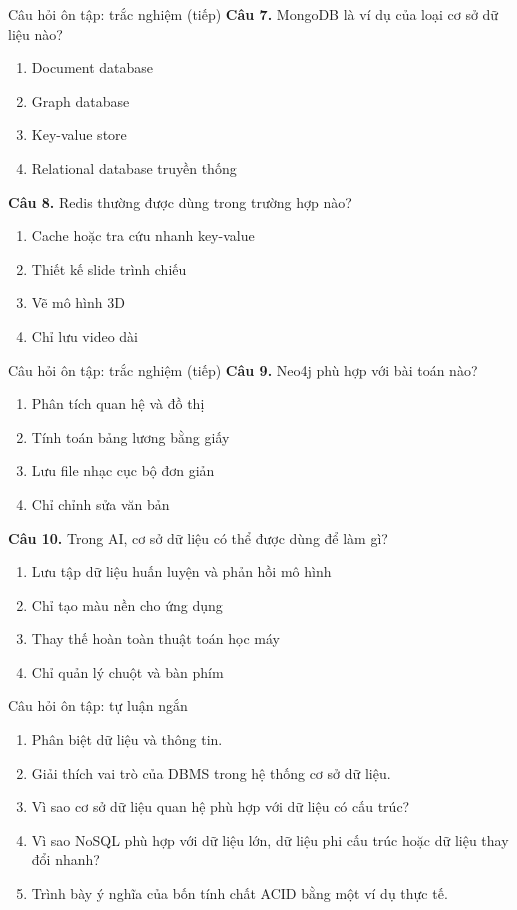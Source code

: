 ﻿\documentclass[aspectratio=169,11pt]{beamer}
\newcommand{\tightlist}{\setlength{\itemsep}{2pt}\setlength{\parskip}{0pt}}
\newcommand{\qoption}[2]{\item[#1.] #2}
\begin{document}
\begin{frame}{Câu hỏi ôn tập: trắc nghiệm (tiếp)}
\small
\textbf{Câu 7.} MongoDB là ví dụ của loại cơ sở dữ liệu nào?
\begin{enumerate}
\tightlist
  \qoption{A}{Document database}
  \qoption{B}{Graph database}
  \qoption{C}{Key-value store}
  \qoption{D}{Relational database truyền thống}
\end{enumerate}

\textbf{Câu 8.} Redis thường được dùng trong trường hợp nào?
\begin{enumerate}
\tightlist
  \qoption{A}{Cache hoặc tra cứu nhanh key-value}
  \qoption{B}{Thiết kế slide trình chiếu}
  \qoption{C}{Vẽ mô hình 3D}
  \qoption{D}{Chỉ lưu video dài}
\end{enumerate}
\end{frame}

\begin{frame}{Câu hỏi ôn tập: trắc nghiệm (tiếp)}
\small
\textbf{Câu 9.} Neo4j phù hợp với bài toán nào?
\begin{enumerate}
\tightlist
  \qoption{A}{Phân tích quan hệ và đồ thị}
  \qoption{B}{Tính toán bảng lương bằng giấy}
  \qoption{C}{Lưu file nhạc cục bộ đơn giản}
  \qoption{D}{Chỉ chỉnh sửa văn bản}
\end{enumerate}

\textbf{Câu 10.} Trong AI, cơ sở dữ liệu có thể được dùng để làm gì?
\begin{enumerate}
\tightlist
  \qoption{A}{Lưu tập dữ liệu huấn luyện và phản hồi mô hình}
  \qoption{B}{Chỉ tạo màu nền cho ứng dụng}
  \qoption{C}{Thay thế hoàn toàn thuật toán học máy}
  \qoption{D}{Chỉ quản lý chuột và bàn phím}
\end{enumerate}
\end{frame}

\begin{frame}{Câu hỏi ôn tập: tự luận ngắn}
\small
\begin{enumerate}
\tightlist
  \item Phân biệt dữ liệu và thông tin.
  \item Giải thích vai trò của DBMS trong hệ thống cơ sở dữ liệu.
  \item Vì sao cơ sở dữ liệu quan hệ phù hợp với dữ liệu có cấu trúc?
  \item Vì sao NoSQL phù hợp với dữ liệu lớn, dữ liệu phi cấu trúc hoặc dữ liệu thay đổi nhanh?
  \item Trình bày ý nghĩa của bốn tính chất ACID bằng một ví dụ thực tế.
\end{enumerate}
\end{frame}
\end{document}
